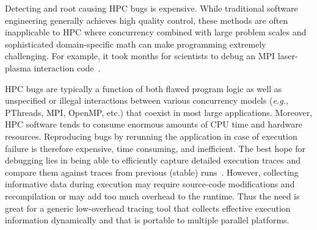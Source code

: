 ﻿
Detecting and root causing HPC bugs is expensive. While traditional software engineering generally achieves high quality control, these methods are often inapplicable to HPC where concurrency combined with large problem scales and sophisticated domain-specific math can make programming extremely challenging. For example, it took months for scientists to debug an MPI laser-plasma interaction code~\cite{hpcdoe}.

HPC bugs are typically a function of both flawed program logic as well as unspecified or illegal interactions between various concurrency models ({\em e.g.}, PThreads, MPI, OpenMP, etc.) that coexist in most large applications. Moreover, HPC software tends to consume enormous amounts of CPU time and hardware resources. Reproducing bugs by rerunning the application in case of execution failure is therefore expensive, time consuming, and inefficient. The best hope for debugging lies in being able to efficiently capture detailed execution traces and compare them against traces from previous (stable) runs~\cite{cstg,stat}. However, collecting informative data during execution may require source-code modifications and recompilation or may add too much overhead to the runtime. Thus the need is great for a generic low-overhead tracing tool that collects effective execution information dynamically and that is portable to multiple parallel platforms.

